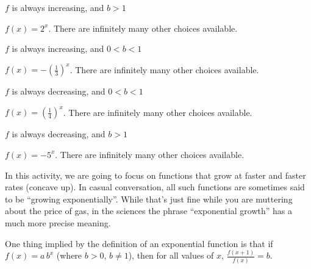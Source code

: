 \begin{exercises}
\begin{problem}
\begin{subproblem}
	$f$ is always increasing, and $b>1$
	\begin{shortsolution}
		$f(x)=2^x$. There are infinitely many other choices available.
	\end{shortsolution}
\end{subproblem}
\begin{subproblem}
	$f$ is always increasing, and $0<b<1$
	\begin{shortsolution}
		$f(x)=-\left(\frac{1}{3}\right)^x$. There are infinitely many other choices available.
	\end{shortsolution}
\end{subproblem}
\begin{subproblem}
	$f$ is always decreasing, and $0<b<1$
	\begin{shortsolution}
		$f(x)=\left(\frac{1}{4}\right)^x$. There are infinitely many other choices available.
	\end{shortsolution}
\end{subproblem}
\begin{subproblem}
	$f$ is always decreasing, and $b>1$
	\begin{shortsolution}
		$f(x) = -5^x$. There are infinitely many other choices available.
	\end{shortsolution}
\end{subproblem}
\end{problem}
\begin{problem}
In this activity, we are going to focus on functions that grow at faster and faster rates (concave up).  In 
casual conversation, all such functions are sometimes said to be ``growing exponentially''.  
While that's just fine while you are muttering about the price of gas, in 
the sciences the phrase ``exponential growth'' has a much more precise meaning.

One thing implied by the definition of an exponential function is that if $f(x)=a\,b^x$ (where $b>0$, $b\neq1$), 
then for all values of $x$, $\displaystyle\frac{f(x+1)}{f(x)}=b$.


\end{problem}
\end{exercises}
